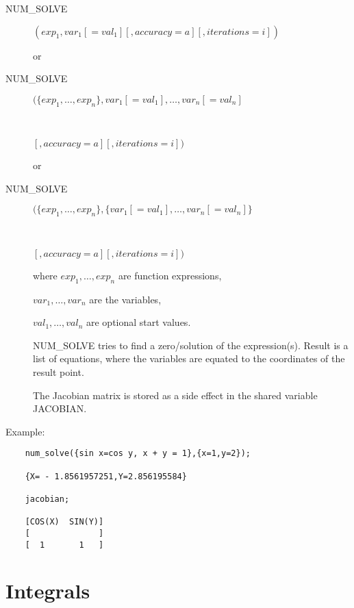 \begin{description}
\item[NUM\_SOLVE]  $(exp_1, var_1[=val_1][,accuracy=a][,iterations=i])$

or

\item[NUM\_SOLVE]  $(\{exp_1,\ldots,exp_n\},
   var_1[=val_1],\ldots,var_n[=val_n]$
\item[\ \ \ \ \ \ \ \ ]$[,accuracy=a][,iterations=i])$

or

\item[NUM\_SOLVE]  $(\{exp_1,\ldots,exp_n\},
   \{var_1[=val_1],\ldots,var_n[=val_n]\}$
\item[\ \ \ \ \ \ \ \ ]$[,accuracy=a][,iterations=i])$

where $exp_1, \ldots,exp_n$ are function expressions,

      $var_1, \ldots, var_n$ are the variables,

      $val_1, \ldots, val_n$ are optional start values.

NUM\_SOLVE tries to find a zero/solution of the expression(s).
Result is a list of equations, where the variables are
equated to the coordinates of the result point.

The Jacobian matrix is stored as a side effect in the shared
variable JACOBIAN.

\end{description}

Example:

\begin{verbatim}
    num_solve({sin x=cos y, x + y = 1},{x=1,y=2});

    {X= - 1.8561957251,Y=2.856195584}

    jacobian;

    [COS(X)  SIN(Y)]
    [              ]
    [  1       1   ]
\end{verbatim}

\section{Integrals}

